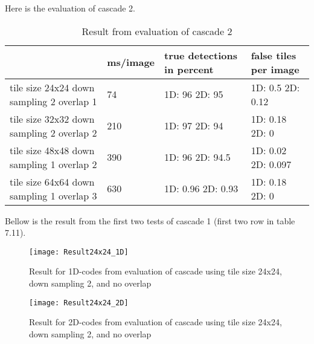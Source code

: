 Here is the evaluation of cascade 2.
\begin{table}[H]
\begin{center}
     \begin{tabular}{ | p{3cm} | l | p{3cm} | p{2cm}|}
     \hline
      	& ms/image & true detections in percent & false tiles \newline per image \\ \hline
   	 tile size 24x24 \newline down sampling 2 \newline overlap 1 
   	 & 74 & 1D: 96 \newline 2D: 95 & 1D: 0.5 \newline 2D: 0.12 				\\ \hline
     tile size 32x32 \newline down sampling 2 \newline overlap 2 
     & 210 & 1D: 97 \newline 2D: 94 & 1D: 0.18 \newline 2D: 0				\\ \hline
     tile size 48x48 \newline down sampling 1 \newline overlap 2 
     & 390    & 1D: 96 \newline 2D: 94.5 & 1D: 0.02 \newline 2D: 0.097
     \\ \hline
     tile size 64x64 \newline down sampling 1 \newline overlap 3 
     & 630 & 1D: 0.96 \newline 2D: 0.93 & 1D: 0.18 \newline 2D: 0		 \\ \hline
     \end{tabular}
\end{center}
\caption{Result from evaluation of cascade 2}
\end{table}

Bellow is the result from the first two tests of cascade 1 (first two row in table 7.11).
\begin{figure}[H]
\centering
	\texttt{[image: Result24x24\_1D]}
	\caption{Result for 1D-codes from evaluation of cascade using tile size 24x24, down sampling 2, and no overlap}
	\label{Result24x24_1D}
\end{figure}

\begin{figure}[H]
\centering
	\texttt{[image: Result24x24\_2D]}
	\caption{Result for 2D-codes from evaluation of cascade using tile size 24x24, down sampling 2, and no overlap}
	\label{Result24x24_2D}
\end{figure}


